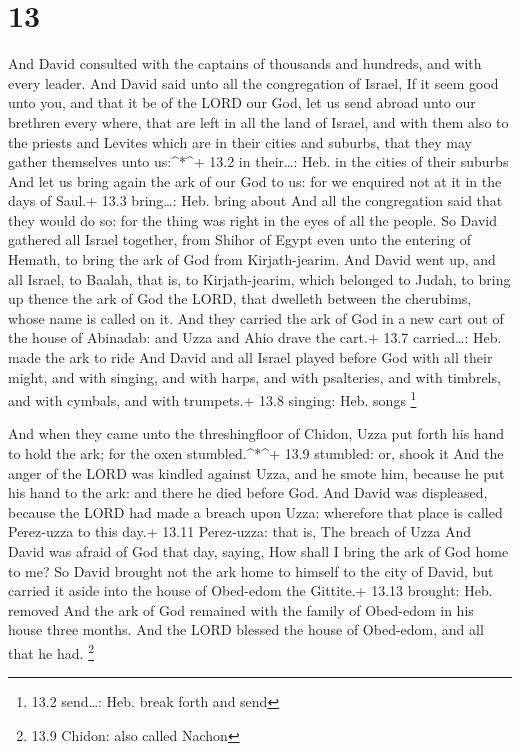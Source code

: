 \hypertarget{section-12}{%
\section{13}\label{section-12}}

 And David consulted with the captains of thousands and
hundreds, and with every leader.  And David said unto all
the congregation of Israel, If it seem good unto you, and that it be of
the LORD our God, let us send abroad unto our brethren every where, that
are left in all the land of Israel, and with them also to the priests
and Levites which are in their cities and suburbs, that they may gather
themselves unto us:\^{}*\^{}+ 13.2 in their\ldots: Heb. in the cities of
their suburbs  And let us bring again the ark of our God to
us: for we enquired not at it in the days of Saul.+ 13.3 bring\ldots:
Heb. bring about  And all the congregation said that they
would do so: for the thing was right in the eyes of all the people.
 So David gathered all Israel together, from Shihor of Egypt
even unto the entering of Hemath, to bring the ark of God from
Kirjath-jearim.  And David went up, and all Israel, to
Baalah, that is, to Kirjath-jearim, which belonged to Judah, to bring up
thence the ark of God the LORD, that dwelleth between the cherubims,
whose name is called on it.  And they carried the ark of God
in a new cart out of the house of Abinadab: and Uzza and Ahio drave the
cart.+ 13.7 carried\ldots: Heb. made the ark to ride  And
David and all Israel played before God with all their might, and with
singing, and with harps, and with psalteries, and with timbrels, and
with cymbals, and with trumpets.+ 13.8 singing: Heb. songs \footnote{13.2
  send\ldots: Heb. break forth and send}

 And when they came unto the threshingfloor of Chidon, Uzza
put forth his hand to hold the ark; for the oxen stumbled.\^{}*\^{}+
13.9 stumbled: or, shook it  And the anger of the LORD was
kindled against Uzza, and he smote him, because he put his hand to the
ark: and there he died before God.  And David was
displeased, because the LORD had made a breach upon Uzza: wherefore that
place is called Perez-uzza to this day.+ 13.11 Perez-uzza: that is, The
breach of Uzza  And David was afraid of God that day,
saying, How shall I bring the ark of God home to me?  So
David brought not the ark home to himself to the city of David, but
carried it aside into the house of Obed-edom the Gittite.+ 13.13
brought: Heb. removed  And the ark of God remained with the
family of Obed-edom in his house three months. And the LORD blessed the
house of Obed-edom, and all that he had. \footnote{13.9 Chidon: also
  called Nachon}

